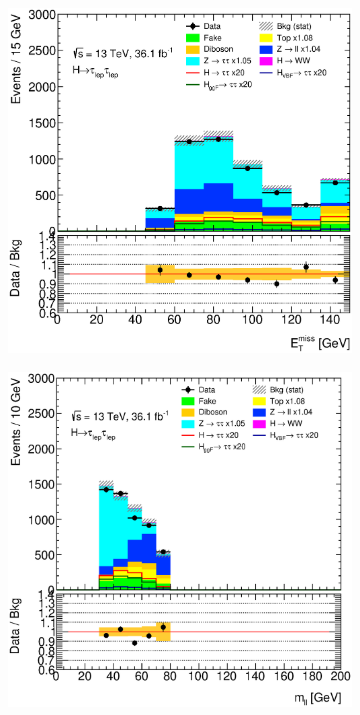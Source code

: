 \begin{figure}[htb]
\begin{subfigure}[t]{0.45\textwidth}
    \end{subfigure}
    \begin{subfigure}[t]{0.45\textwidth}
        \includegraphics[width=\textwidth]{./plots/mva/modeling/input_vars/BOOST_SF/ll-CutMVABoostedCatSF-MET-lin.eps}
    \end{subfigure}
    \begin{subfigure}[t]{0.45\textwidth}
        \includegraphics[width=\textwidth]{./plots/mva/modeling/input_vars/BOOST_SF/ll-CutMVABoostedCatSF-mvis-lin.eps}

\end{subfigure}
\end{figure}
